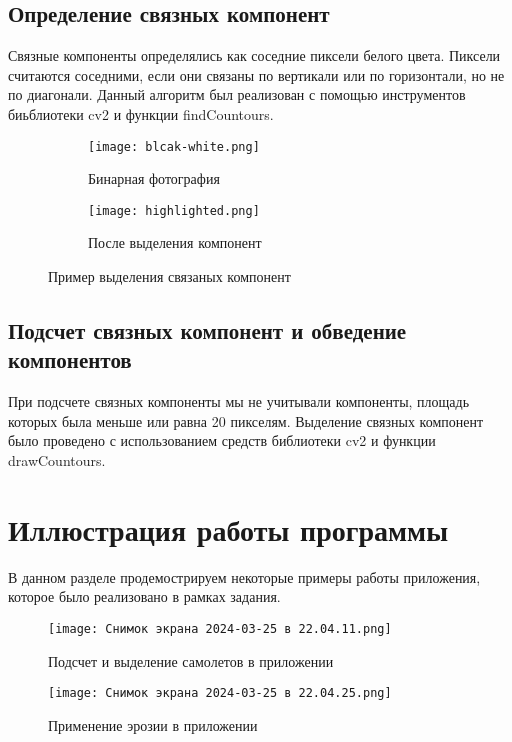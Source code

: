 \documentclass{article}
\begin{document}
\subsection{Определение связных компонент}

Связные компоненты определялись как соседние пиксели белого цвета. Пиксели считаются соседними, если они связаны по вертикали или по горизонтали, но не по диагонали. Данный алгоритм был реализован с помощью инструментов биьблиотеки cv2 и функции findCountours.

\begin{figure}[h!]
  \centering
  \begin{subfigure}[b]{0.4\linewidth}
    \texttt{[image: blcak-white.png]}
    \caption{Бинарная фотография}
    \label{fig:sub1}
  \end{subfigure}
  \begin{subfigure}[b]{0.4\linewidth}
    \texttt{[image: highlighted.png]}
    \caption{После выделения компонент}
    \label{fig:sub2}
  \end{subfigure}
  \caption{Пример выделения связаных компонент}
  \label{fig:twophotos}
\end{figure}

\subsection{Подсчет связных компонент и обведение компонентов}

При подсчете связных компоненты мы не учитывали компоненты, площадь которых была меньше или равна 20 пикселям. Выделение связных компонент было проведено с использованием средств библиотеки cv2 и функции drawCountours.

\section{Иллюстрация работы программы}

В данном разделе продемострируем некоторые примеры работы приложения, которое было реализовано в рамках задания.

\begin{figure}[h!]
    \centering
    \texttt{[image: Снимок экрана 2024-03-25 в 22.04.11.png]}
    \caption{Подсчет и выделение самолетов в приложении}
    \label{fig:enter-label}
\end{figure}

\begin{figure}[h!]
    \centering
    \texttt{[image: Снимок экрана 2024-03-25 в 22.04.25.png]}
    \caption{Применение эрозии в приложении}
    \label{fig:enter-label}
\end{figure}
\end{document}
